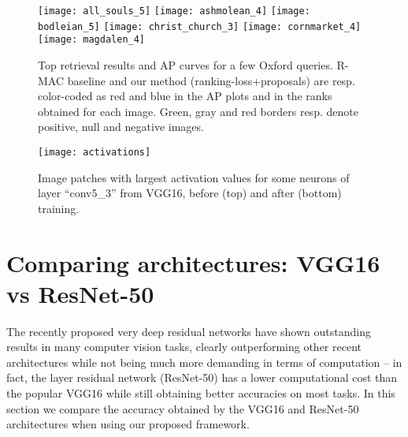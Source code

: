 \documentclass[runningheads]{llncs}
\begin{document}
 \begin{figure}[b!]
 \begin{centering}
\texttt{[image: all\_souls\_5]}
\texttt{[image: ashmolean\_4]}
\texttt{[image: bodleian\_5]}
\texttt{[image: christ\_church\_3]}
\texttt{[image: cornmarket\_4]}
\texttt{[image: magdalen\_4]}
 \par\end{centering}
 \caption{\label{fig:ox-qual}Top retrieval results and AP curves for a few Oxford queries. R-MAC
 baseline and our method (ranking-loss+proposals) are resp. color-coded as red and blue in the AP plots 
 and in the ranks obtained for each image.
 Green, gray and red borders resp. denote positive, null and negative images.}
 \vspace{-0.3cm}
 \end{figure}

 \begin{figure}[t!]
\centering
 \texttt{[image: activations]}
 \caption{\label{fig:activations} Image patches with largest activation values for some neurons of layer ``conv5\_3'' from VGG16, before (top) and after (bottom) training.}
 \end{figure}

\section{Comparing architectures: VGG16 vs ResNet-50}
The recently proposed very deep residual networks \cite{He2016} have shown outstanding results in many computer vision tasks, clearly outperforming other recent architectures while not being much more demanding in terms of computation -- in fact, the  layer residual network (ResNet-50) has a lower computational cost than the popular VGG16 while still obtaining better accuracies on most tasks.
In this section we compare the accuracy obtained by the VGG16 and ResNet-50 architectures when using our proposed framework.
\end{document}
